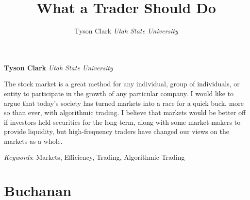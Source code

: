 \documentclass[11pt,]{article}
\title{What a Trader Should Do  }
\author{\Large Tyson Clark\vspace{0.05in} \newline\normalsize\emph{Utah State University}  }
\date{}
\newcommand*{\authorfont}{\fontfamily{phv}\selectfont}
\renewenvironment{abstract}
 {{%
    \setlength{\leftmargin}{0mm}
    \setlength{\rightmargin}{\leftmargin}%
  }%
  \relax}
 {\endlist}
\begin{document}
	
%

{%
\setlength{\parindent}{0pt}
\thispagestyle{plain}
{\fontsize{18}{20}\selectfont\raggedright 
\maketitle  %

}

{
   \vskip 13.5pt\relax \normalsize\fontsize{11}{12} 
\textbf{\authorfont Tyson Clark} \hskip 15pt \emph{\small Utah State University}   

}

}







\begin{abstract}

    \hbox{\vrule height .2pt width 39.14pc}

    \vskip 8.5pt %

\noindent The stock market is a great method for any individual, group of
individuals, or entity to participate in the growth of any particular
company. I would like to argue that today's society has turned markets
into a race for a quick buck, more so than ever, with algorithmic
trading. I believe that markets would be better off if investors held
securities for the long-term, along with some market-makers to provide
liquidity, but high-frequency traders have changed our views on the
markets as a whole.


\vskip 8.5pt \noindent \emph{Keywords}: Markets, Efficiency, Trading, Algorithmic Trading \par

    \hbox{\vrule height .2pt width 39.14pc}



\end{abstract}


\vskip 6.5pt

\noindent \doublespacing \begin{quote}
\end{quote}

\section{Buchanan}\label{buchanan}
\end{document}
